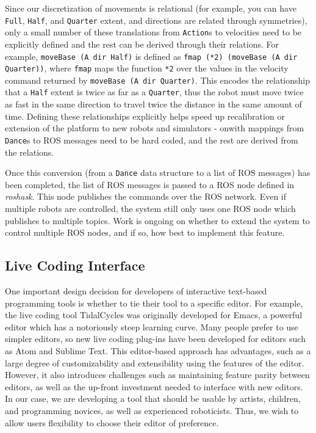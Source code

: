 \documentclass[sigchi-a]{acmart}
\begin{document}
Since our discretization of movements is relational (for
example, you can have \texttt{Full}, \texttt{Half}, and \texttt{Quarter} extent,
and directions are related through symmetries), only a small number of these
translations from \texttt{Action}s to velocities need to be explicitly defined
and the rest can be derived through their relations. For example,
\texttt{moveBase (A dir Half)} is defined as \texttt{fmap (*2) (moveBase (A dir
Quarter))},
where \texttt{fmap} maps the function \texttt{*2} over the values in the velocity
command returned by \texttt{moveBase (A dir Quarter)}. This encodes the relationship
that a \texttt{Half} extent is twice as far as a \texttt{Quarter}, thus the
robot must move twice as fast in the same direction to travel twice the distance
in the same amount of time. Defining these relationships explicitly helps speed
up recalibration or extension of the platform to new robots and simulators -
onwith mappings from \texttt{Dance}s to ROS messages need to be hard coded,
and the rest are derived from the relations.

Once this conversion (from a \texttt{Dance} data structure to a list of ROS messages)
has been completed, the list of ROS messages is passed to a ROS
node defined in \emph{roshask}. This node publishes the commands over the ROS network.
Even if multiple robots are controlled, the system still only uses one ROS node
which publishes to multiple topics. Work is ongoing on whether to extend the
system to control multiple ROS nodes, and if so, how best to implement this
feature.

\subsection{Live Coding Interface}\label{live-coding-interface}

One important design decision for developers of interactive text-based
programming tools is whether to tie their tool to a specific editor. For
example, the live coding tool TidalCycles was originally
developed for Emacs, a powerful editor which has a notoriously steep
learning curve. Many people prefer to use simpler editors, so new
live coding plug-ins have been developed for editors such as Atom and
Sublime Text. This editor-based approach has advantages, such as a large
degree of customizability and extensibility using the features of the
editor. However, it also introduces challenges such as maintaining
feature parity between editors, as well as the up-front investment
needed to interface with new editors. In our case, we are developing a
tool that should be usable by artists, children, and programming
novices, as well as experienced roboticists. Thus, we wish to allow
users flexibility to choose their editor of preference.
\end{document}
